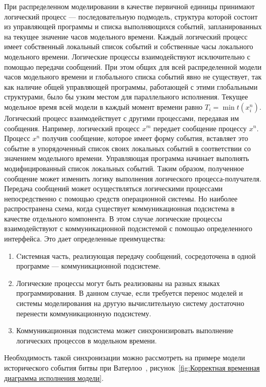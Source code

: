 При распределенном моделировании в качестве первичной единицы принимают логический процесс --- последовательную подмодель, структура которой состоит из управляющей программы и списка выполняющихся событий, запланированных на текущее значение часов модельного времени. Каждый логический процесс имеет собственный локальный список событий и собственные часы локального модельного времени. Логические процессы взаимодействуют исключительно с помощью передачи сообщений.
При этом общих для всей распределенной модели часов модельного времени и глобального списка событий явно не существует, так как наличие общей управляющей программы, работающей с этими глобальными структурами, было бы узким местом для параллельного исполнения.
Текущее модельное время всей модели в каждый момент времени равно $T_i=\min t(x_i^n)$. Логический процесс взаимодействует с другими процессами, передавая им сообщения. Например, логический процесс $x^m$ передает сообщение процессу $x^n$. Процесс $x^n$ получив сообщение, которое имеет форму события, вставляет это событие в упорядоченный список своих локальных событий в соответствии со значением модельного времени. Управляющая программа начинает выполнять модифицированный список локальных событий. Таким образом, полученное сообщение может изменить логику выполнения логического процесса-получателя. Передача сообщений может осуществляться логическими процессами непосредственно с помощью средств операционной системы. Но наиболее распространена схема, когда существует коммуникационная подсистема в качестве отдельного компонента. В этом случае логические процессы взаимодействуют с коммуникационной подсистемой с помощью определенного интерфейса. Это дает определенные преимущества:
\begin{enumerate}
\item Cистемная часть, реализующая передачу сообщений, сосредоточена в одной программе --- коммуникационной подсистеме.
\item Логические процессы могут быть реализованы на разных языках программирования.  В данном случае, если требуется перенос моделей и системы моделирования на другую вычислительную систему достаточно перенести коммуникационную подсистему.
\item Коммуникационная подсистема может синхронизировать выполнение логических процессов в модельном времени.
\end{enumerate}

Необходимость такой синхронизации можно рассмотреть на примере модели исторического события битвы при Ватерлоо~\cite{napoleon}, рисунок~\ref{fig:Корректная временная диаграмма исполнения модели}.

